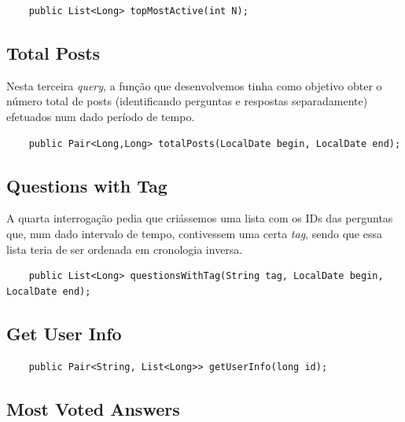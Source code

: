 \documentclass[a4paper, 11pt, oneside]{article}
\begin{document}
\begin{lstlisting}
	public List<Long> topMostActive(int N);
\end{lstlisting}




\subsection{Total Posts}

Nesta terceira \textit{query}, a função que desenvolvemos tinha como objetivo obter o número total de posts (identificando perguntas e respostas separadamente) 
efetuados num dado período de tempo.

\begin{lstlisting}
	public Pair<Long,Long> totalPosts(LocalDate begin, LocalDate end);
\end{lstlisting}



\subsection{Questions with Tag}

A quarta interrogação pedia que criássemos uma lista com os IDs das perguntas que, num dado intervalo de tempo, contivessem uma certa \textit{tag}, sendo que essa 
lista teria de ser ordenada em cronologia inversa.

\begin{lstlisting}
	public List<Long> questionsWithTag(String tag, LocalDate begin, LocalDate end);
\end{lstlisting}




\subsection{Get User Info}

\begin{lstlisting}
	public Pair<String, List<Long>> getUserInfo(long id);
\end{lstlisting}



\subsection{Most Voted Answers}
\end{document}
